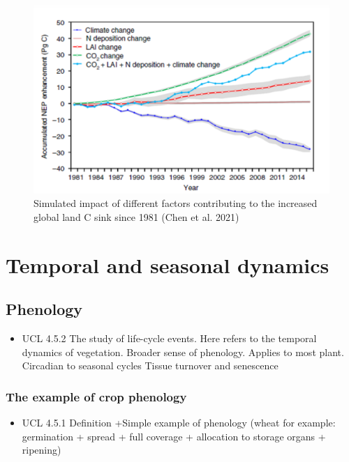 \documentclass[12pt,oneside]{book}
\providecommand{\tightlist}{%
  \setlength{\itemsep}{0pt}\setlength{\parskip}{0pt}}
\begin{document}
\begin{figure}

{\centering \includegraphics[width=0.8\linewidth]{figures/chap3/f335_chen2} 

}

\caption{Simulated impact of different factors contributing to the increased global land C sink since 1981 (Chen et al. 2021) }\label{fig:f335}
\end{figure}

\chapter{Temporal and seasonal
dynamics}\label{temporal-and-seasonal-dynamics}


\section{Phenology}\label{phenology}

\begin{itemize}
\tightlist
\item
  UCL 4.5.2 The study of life-cycle events. Here refers to the temporal
  dynamics of vegetation. Broader sense of phenology. Applies to most
  plant. Circadian to seasonal cycles Tissue turnover and senescence
\end{itemize}

\subsection{The example of crop
phenology}\label{the-example-of-crop-phenology}

\begin{itemize}
\tightlist
\item
  UCL 4.5.1 Definition +Simple example of phenology (wheat for example:
  germination + spread + full coverage + allocation to storage organs +
  ripening)
\end{itemize}
\end{document}
